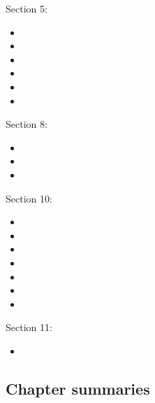 \begin{ASM_chapter}
Section 5: 
\begin{itemize}[leftmargin = *]
	\item	{}
	\item	{}
	\item	{}
	\item	{}
	\item	{}
	\item	{}
\end{itemize}
Section 8: 
\begin{itemize}[leftmargin = *]
	\item	{}
	\item	{}
	\item	{}
\end{itemize}
Section 10: 
\begin{itemize}[leftmargin = *]
	\item	{}
	\item	{}
	\item	{}
	\item	{}
	\item	{}
	\item	{}
	\item	{}
\end{itemize}
Section 11: 
\begin{itemize}[leftmargin = *]
	\item	{}
\end{itemize}
\end{ASM_chapter}

\subsection{Chapter summaries}

